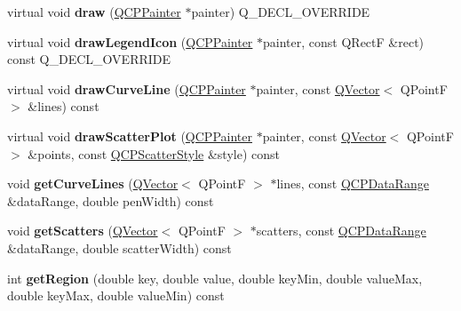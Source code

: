 \begin{DoxyCompactItemize}
\item 
virtual void {\bfseries draw} (\hyperlink{class_q_c_p_painter}{Q\+C\+P\+Painter} $\ast$painter) Q\+\_\+\+D\+E\+C\+L\+\_\+\+O\+V\+E\+R\+R\+I\+DE\hypertarget{class_q_c_p_curve_abf0a47e94e3c0d3b3ab4d83bca190287}{}\label{class_q_c_p_curve_abf0a47e94e3c0d3b3ab4d83bca190287}

\item 
virtual void {\bfseries draw\+Legend\+Icon} (\hyperlink{class_q_c_p_painter}{Q\+C\+P\+Painter} $\ast$painter, const Q\+RectF \&rect) const Q\+\_\+\+D\+E\+C\+L\+\_\+\+O\+V\+E\+R\+R\+I\+DE\hypertarget{class_q_c_p_curve_a8089dd4f58308934371e11d47e163ff7}{}\label{class_q_c_p_curve_a8089dd4f58308934371e11d47e163ff7}

\item 
virtual void {\bfseries draw\+Curve\+Line} (\hyperlink{class_q_c_p_painter}{Q\+C\+P\+Painter} $\ast$painter, const \hyperlink{class_q_vector}{Q\+Vector}$<$ Q\+PointF $>$ \&lines) const \hypertarget{class_q_c_p_curve_a690a9b11b5a4657cdab61f41d4ce553e}{}\label{class_q_c_p_curve_a690a9b11b5a4657cdab61f41d4ce553e}

\item 
virtual void {\bfseries draw\+Scatter\+Plot} (\hyperlink{class_q_c_p_painter}{Q\+C\+P\+Painter} $\ast$painter, const \hyperlink{class_q_vector}{Q\+Vector}$<$ Q\+PointF $>$ \&points, const \hyperlink{class_q_c_p_scatter_style}{Q\+C\+P\+Scatter\+Style} \&style) const \hypertarget{class_q_c_p_curve_a1d4e3e98b0d82cf098d4a0fcbb288b37}{}\label{class_q_c_p_curve_a1d4e3e98b0d82cf098d4a0fcbb288b37}

\item 
void {\bfseries get\+Curve\+Lines} (\hyperlink{class_q_vector}{Q\+Vector}$<$ Q\+PointF $>$ $\ast$lines, const \hyperlink{class_q_c_p_data_range}{Q\+C\+P\+Data\+Range} \&data\+Range, double pen\+Width) const \hypertarget{class_q_c_p_curve_a90999a3378969ed08046395fa8fab37b}{}\label{class_q_c_p_curve_a90999a3378969ed08046395fa8fab37b}

\item 
void {\bfseries get\+Scatters} (\hyperlink{class_q_vector}{Q\+Vector}$<$ Q\+PointF $>$ $\ast$scatters, const \hyperlink{class_q_c_p_data_range}{Q\+C\+P\+Data\+Range} \&data\+Range, double scatter\+Width) const \hypertarget{class_q_c_p_curve_aaa0cc6dc484d2fc98ebaee4b121206fa}{}\label{class_q_c_p_curve_aaa0cc6dc484d2fc98ebaee4b121206fa}

\item 
int {\bfseries get\+Region} (double key, double value, double key\+Min, double value\+Max, double key\+Max, double value\+Min) const \hypertarget{class_q_c_p_curve_a8e0df32978cc526d2f3f0e342834bd4c}{}\label{class_q_c_p_curve_a8e0df32978cc526d2f3f0e342834bd4c}


\end{DoxyCompactItemize}
